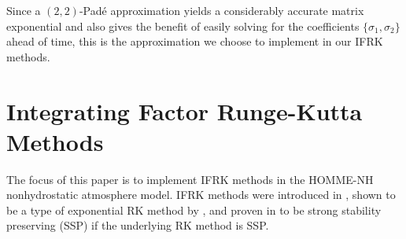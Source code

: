 \documentclass{csri19}
\begin{document}
Since a $(2,2)$-Pad\'e approximation yields a considerably accurate matrix 
exponential and also gives the benefit of easily solving for the 
coefficients $\{\sigma_1, \sigma_2\}$ ahead of time, this is the 
approximation we choose to implement in our IFRK methods.

\section{Integrating Factor Runge-Kutta Methods}\label{CFK:sec:ifrk}
The focus of this paper is to implement IFRK methods in the HOMME-NH 
nonhydrostatic atmosphere model. IFRK methods were introduced in 
\cite{CFK:Lawson1969}, shown to be a type of exponential RK method by
\cite{CFK:Minchev2006}, and proven in \cite{CFK:Isherwood2018} to be 
strong stability preserving (SSP) if the underlying RK method is SSP.
\end{document}
